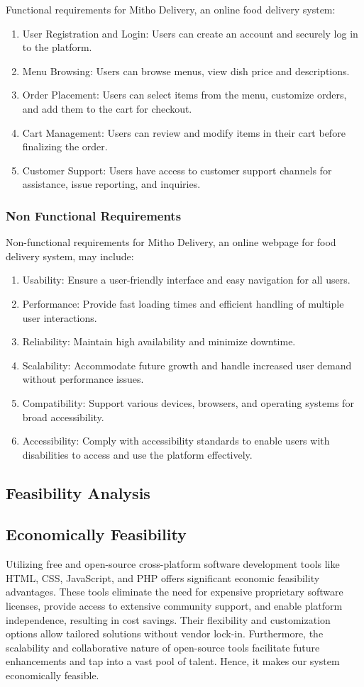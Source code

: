     
Functional requirements for Mitho Delivery, an online food delivery system: 	
\begin{enumerate} 
\item User Registration and Login: Users can create an account and securely log in to the platform. 
\item Menu Browsing: Users can browse menus, view dish price and descriptions.
\item Order Placement: Users can select items from the menu, customize orders, and add them to the cart for checkout. 
\item Cart Management: Users can review and modify items in their cart before finalizing the order. 
\item Customer Support: Users have access to customer support channels for assistance, issue reporting, and inquiries.
\end{enumerate}
\subsubsection{Non Functional Requirements}
Non-functional requirements for Mitho Delivery, an online webpage for food delivery system, may include:
\begin{enumerate}
    \item Usability: Ensure a user-friendly interface and easy navigation for all users.
    \item Performance: Provide fast loading times and efficient handling of multiple user interactions.
    \item Reliability: Maintain high availability and minimize downtime.
    \item Scalability: Accommodate future growth and handle increased user demand without performance issues.
    \item Compatibility: Support various devices, browsers, and operating systems for broad accessibility.
    \item Accessibility: Comply with accessibility standards to enable users with disabilities to access and use the platform effectively.
\end{enumerate}

\newpage
\subsection{Feasibility Analysis}
\subsection*{Economically Feasibility}
Utilizing free and open-source cross-platform software development tools like HTML, CSS,
JavaScript, and PHP offers significant economic feasibility advantages. These tools eliminate
the need for expensive proprietary software licenses, provide access to extensive community
support, and enable platform independence, resulting in cost savings. Their flexibility and
customization options allow tailored solutions without vendor lock-in. Furthermore, the scalability
and collaborative nature of open-source tools facilitate future enhancements and tap into a vast
pool of talent. Hence, it makes our system economically feasible.

